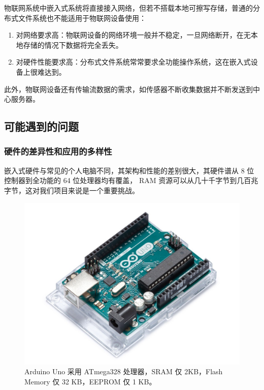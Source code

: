 \documentclass{ctexart}
\begin{document}
物联网系统中嵌入式系统将直接接入网络，但若不搭载本地可擦写存储，普通的分布式文件系统也不能适用于物联网设备使用：
\begin{enumerate}
	\item 对网络要求高：物联网设备的网络环境一般并不稳定，一旦网络断开，在无本地存储的情况下数据将完全丢失。
	\item 对硬件性能要求高：分布式文件系统常常要求全功能操作系统，这在嵌入式设备上很难达到。
\end{enumerate}

此外，物联网设备还有传输流数据的需求，如传感器不断收集数据并不断发送到中心服务器。

\subsection{可能遇到的问题}
\subsubsection{硬件的差异性和应用的多样性}
嵌入式硬件与常见的个人电脑不同，其架构和性能的差别很大，其硬件谱从 8 位控制器到全功能的 64 位处理器均有覆盖，
RAM 资源可以从几十千字节到几百兆字节，这对我们项目来说是一个重要挑战。

\begin{figure}
	\centering
	\includegraphics[scale=0.3]{arduino.jpg}
	\caption{Arduino Uno 采用 ATmega328 处理器，SRAM 仅 2KB，Flash Memory 仅 32 KB，EEPROM 仅 1 KB。}
\end{figure}
\end{document}
